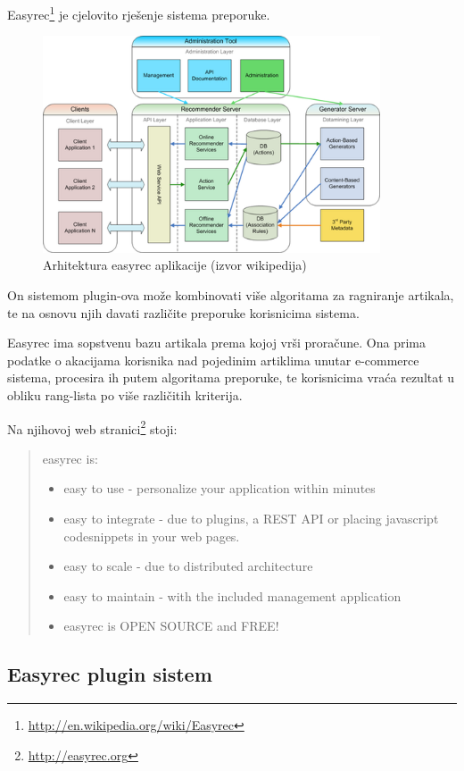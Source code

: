 \documentclass[times, utf8, seminar]{fit}
\begin{document}
{{Easyrec\footnote{\url{http://en.wikipedia.org/wiki/Easyrec}} je cjelovito rješenje sistema preporuke.

\begin{figure}[H]
\centering
\includegraphics[width=10cm]{img/Easyrec_architecture.png}
\caption{Arhitektura easyrec aplikacije (izvor wikipedija)}
\end{figure}

On sistemom plugin-ova može kombinovati više algoritama za ragniranje artikala, te na osnovu njih davati različite preporuke korisnicima sistema.

Easyrec ima sopstvenu bazu artikala prema kojoj vrši proračune. Ona prima podatke o akacijama korisnika nad pojedinim artiklima unutar e-commerce sistema, 
procesira ih putem algoritama preporuke, te korisnicima vraća rezultat u obliku rang-lista po više različitih kriterija.

Na njihovoj web stranici\footnote{\url{http://easyrec.org}} stoji:

\begin{quotation}
easyrec is:
\begin{itemize}
\item easy to use - personalize your application within minutes
\item easy to integrate - due to plugins, a REST API or placing javascript codesnippets in your web pages.
\item easy to scale - due to distributed architecture
\item easy to maintain - with the included management application
\item easyrec is OPEN SOURCE and FREE!
\end{itemize}
\end{quotation}

\subsection{Easyrec plugin sistem} 

}}
\end{document}

